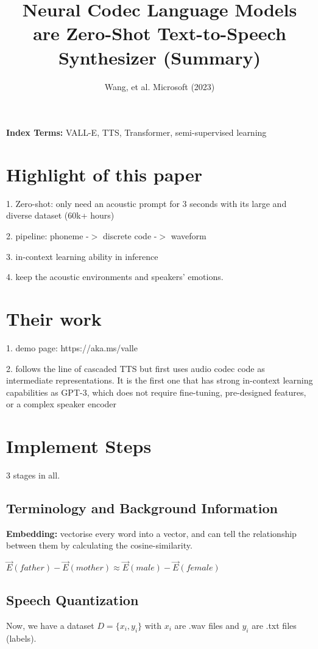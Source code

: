 \documentclass{article}
\title{Neural Codec Language Models are
Zero-Shot Text-to-Speech Synthesizer (Summary)}
\author{Wang, et al. Microsoft (2023)}
\begin{document}
\maketitle
\textbf{Index Terms:} VALL-E, TTS, Transformer, semi-supervised learning


\section{Highlight of this paper}
1. Zero-shot: only need an acoustic prompt for 3 seconds with its large and diverse dataset (60k+ hours)

2. pipeline: phoneme -$>$ discrete code -$>$ waveform

3. in-context learning ability in inference

4. keep the acoustic environments and speakers' emotions. 

\vspace{-10pt}
\section{Their work}
\vspace{-5pt}
1. demo page: https://aka.ms/valle

2.  follows the line of cascaded TTS but first uses audio codec code as intermediate representations. It is the first one that has strong in-context learning capabilities as GPT-3, which does not require fine-tuning, pre-designed features, or a complex speaker encoder

\vspace{-10pt}
\section{Implement Steps}
\vspace{-5pt}
3 stages in all. 

\vspace{-10pt}
\subsection{Terminology and Background Information}

\textbf{Embedding:} vectorise every word into a vector, and can tell the relationship between them by calculating the cosine-similarity. 

$\vec{E}(father)-\vec{E}(mother) \approx \vec E (male)-\vec E(female)$

\subsection{Speech Quantization}
Now, we have a dataset $D = \{x_i, y_i\}$ with $x_i$ are .wav files and $y_i$ are .txt files (labels).
\end{document}
